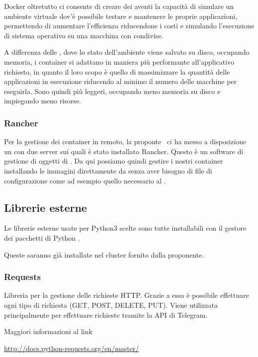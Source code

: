 Docker oltretutto ci consente di creare dei  aventi la capacità di simulare un ambiente virtuale dov'è possibile testare e mantenere le proprie applicazioni,
permettendo di aumentare l'efficienza riducendone i costi e simulando l'esecuzione di sistema operativo su una macchina con  condivise.

A differenza delle , dove lo stato dell'ambiente viene salvato su disco, occupando memoria, i container si adattano in maniera più performante
all'applicativo richiesto, in quanto il loro scopo è quello di massimizzare la quantità delle applicazioni in esecuzione riducendo al minimo il numero delle macchine per eseguirla.
Sono quindi più leggeri, occupando meno memoria su disco e impiegando meno risorse.

\subsubsection{Rancher}
Per la gestione dei container in remoto, la proponte \II~ci ha messo a disposizione un  con due server sui quali è stato installato Rancher. Questo
è un software di gestione di oggetti di .
Da qui possiamo quindi gestire i nostri container installando le immagini direttamente da  senza aver bisogno di file di configurazione
come ad esempio quello necessario al .


\subsection{Librerie esterne}

Le librerie esterne usate per Python3 scelte sono tutte installabili con il gestore dei pacchetti di Python . \par

Queste saranno già installate nel cluster fornito dalla proponente.

\subsubsection{Requests}
Libreria per la gestione delle richieste HTTP. Grazie a essa è possibile effettuare ogni tipo di richiesta (GET, POST, DELETE, PUT).
Viene utilizzata principalmente per effettuare richieste tramite la API di Telegram.

Maggiori informazioni al link

\begin{center}
    \url{http://docs.python-requests.org/en/master/}
\end{center}

